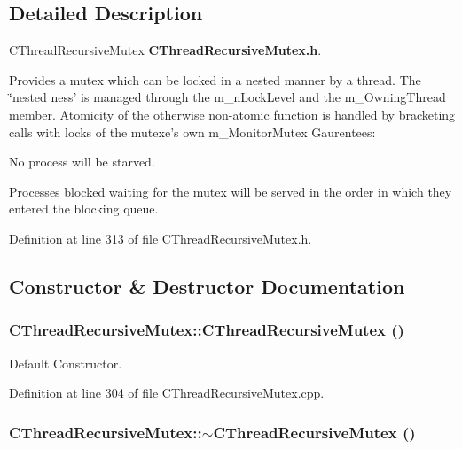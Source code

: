 \subsection{Detailed Description}
CThread\-Recursive\-Mutex {\bf CThread\-Recursive\-Mutex.h}.

Provides a mutex which can be locked in a nested manner by a thread. The \char`\"{}nested ness' is managed through the m\_\-n\-Lock\-Level and the  m\_\-Owning\-Thread member. Atomicity of the otherwise non-atomic  function is handled by bracketing calls with locks of the mutexe's own m\_\-Monitor\-Mutex Gaurentees:\begin{CompactItemize}
\item 
No process will be starved.\item 
Processes blocked waiting for the mutex will be served in the order in which they entered the blocking queue. \end{CompactItemize}




Definition at line 313 of file CThread\-Recursive\-Mutex.h.

\subsection{Constructor \& Destructor Documentation}
\subsubsection{\setlength{\rightskip}{0pt plus 5cm}CThread\-Recursive\-Mutex::CThread\-Recursive\-Mutex ()}\label{classCThreadRecursiveMutex_a0}


Default Constructor.



Definition at line 304 of file CThread\-Recursive\-Mutex.cpp.
\subsubsection{\setlength{\rightskip}{0pt plus 5cm}CThread\-Recursive\-Mutex::$\sim$CThread\-Recursive\-Mutex ()}\label{classCThreadRecursiveMutex_a1}


